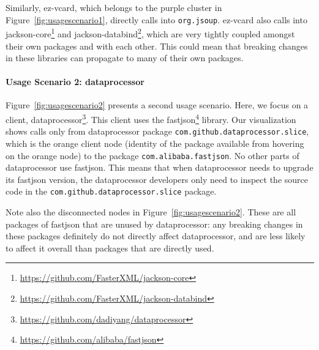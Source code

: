 Similarly, ez-vcard, which belongs to the purple cluster in Figure~\ref{fig:usagescenario1}, directly calls into \texttt{org.jsoup}. ez-vcard also calls into jackson-core\footnote{\url{https://github.com/FasterXML/jackson-core}\label{jackson-core}} and jackson-databind\footnote{\url{https://github.com/FasterXML/jackson-databind}\label{jackson-databind}}, which are very tightly coupled amongst their own packages and with each other. This could mean that breaking changes in these libraries can propagate to many of their own packages.

\paragraph{Usage Scenario 2: dataprocessor}

Figure~\ref{fig:usagescenario2} presents a second usage scenario. Here, we focus on a client, dataprocessor\footnote{\url{https://github.com/dadiyang/dataprocessor}\label{dataprocessor}}. This client uses the fastjson\footnote{\url{https://github.com/alibaba/fastjson}\label{fastjson}} library. Our visualization shows calls only from dataprocessor package \texttt{com.github.dataprocessor.slice}, which is the orange client node (identity of the package available from hovering on the orange node) to the package \texttt{com.alibaba.fastjson}. No other parts of dataprocessor use fastjson. This means that when dataprocessor needs to upgrade its fastjson version, the dataprocessor developers only need to inspect the source code in the \texttt{com.github.dataprocessor.slice} package. 

Note also the disconnected nodes in Figure~\ref{fig:usagescenario2}. These are all packages of fastjson that are unused by dataprocessor: any breaking changes in these packages definitely do not directly affect dataprocessor, and are less likely to affect it overall than packages that are directly used.

